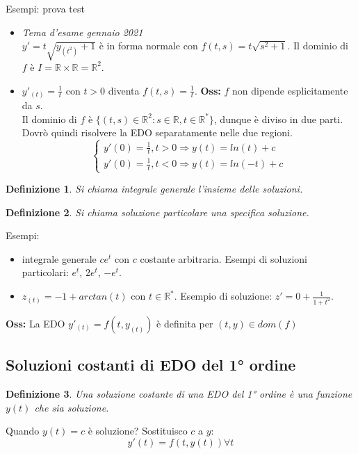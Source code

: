 \documentclass{scrreprt}
\newtheorem{defn}{Definizione}
\newenvironment{definition}{\begin{mdframed}[backgroundcolor=Ivory2]\begin{defn}}{\end{defn}\end{mdframed}}
\begin{document}
Esempi:
prova
test
\begin{itemize}
	\item \emph{Tema d'esame gennaio 2021}\\$y' = t \sqrt{y_{(t^2)}+1}$ è in forma normale con $f(t,s) = t \sqrt{s^2+1}$. Il dominio di $f$ è $I = \mathbb{R} \times \mathbb{R} = \mathbb{R}^2$.
	\item $y'_{(t)} = \frac{1}{t}$ con $t>0$ diventa $f(t,s) = \frac{1}{t}$. \textbf{Oss:} $f$ non dipende esplicitamente da $s$. \\ Il dominio di $f$ è $\{(t,s) \in \mathbb{R}^2 : s\in\mathbb{R}, t\in\mathbb{R}^* \}$, dunque è diviso in due parti.
			Dovrò quindi risolvere la EDO separatamente nelle due regioni.
			$$ \left\{\begin{array}{lr} y'(0)=\frac{1}{t},	t>0 \Rightarrow y(t) = ln(t)+c\\ y'(0)=\frac{1}{t},	t<0 \Rightarrow y(t) = ln(-t)+c \end{array}\right. $$
\end{itemize}
\begin{definition}
	Si chiama \emph{integrale generale} l'insieme delle soluzioni.
\end{definition}
\begin{definition}
	Si chiama \emph{soluzione particolare} una specifica soluzione.
\end{definition}
Esempi:
\begin{itemize}
	\item integrale generale $ce^t$ con $c$ costante arbitraria. Esempi di soluzioni particolari: $e^t$, $2e^t$, $-e^t$.
	\item $z_{(t)} = -1 + arctan(t)$ con $t\in\mathbb{R}^*$. Esempio di soluzione: $z' = 0 + \frac{1}{1+t^2}$.
\end{itemize}
\textbf{Oss:} La EDO $y'_{(t)} = f(t,y_{(t)})$ è definita per $(t,y)\in dom(f)$

\subsection{Soluzioni costanti di EDO del 1° ordine}
\begin{definition}
	Una soluzione costante di una EDO del 1° ordine è una funzione $y(t)$ che sia soluzione.
\end{definition}
Quando $y(t)=c$ è soluzione? Sostituisco $c$ a $y$:
\begin{equation}
	y'(t) = f(t,y(t)) \forall t
\end{equation}
\end{document}
